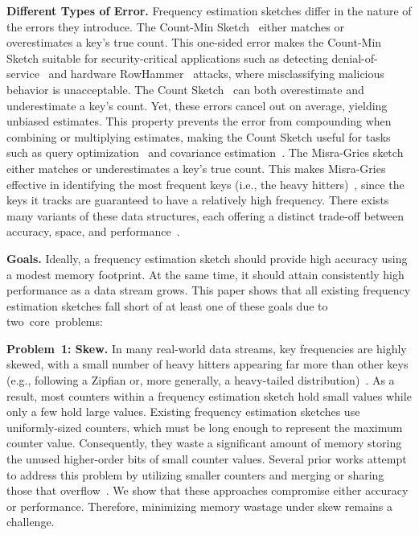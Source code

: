 \documentclass[sigconf]{acmart}
\begin{document}
\textbf{Different Types of Error.}
Frequency estimation sketches differ in the nature of the errors they introduce.
The Count-Min Sketch~\cite{CountMin} either matches or overestimates a key's true count.
This one-sided error makes the Count-Min Sketch suitable for security-critical applications such as detecting denial-of-service~\cite{CoDDoS} and hardware RowHammer~\cite{CoMeT} attacks, where misclassifying malicious behavior is unacceptable.
The Count Sketch~\cite{CountSketch} can both overestimate and underestimate a key's count.
Yet, these errors cancel out on average, yielding unbiased estimates.
This property prevents the error from compounding when combining or multiplying estimates, making the Count Sketch useful for tasks such as query optimization~\cite{Compass,QueryOptimizationSketches,ConvolutionSketch} and covariance estimation~\cite{ASCS}.
The Misra-Gries sketch~\cite{MisraGries} either matches or underestimates a key's true count.
This makes Misra-Gries effective in identifying the most frequent keys (i.e., the heavy hitters)~\cite{NetworkAnomalyDetection1,NetworkAnomalyDetection2}, since the keys it tracks are guaranteed to have a relatively high frequency.
There exists many variants of these data structures, each offering a distinct trade-off between accuracy, space, and \mbox{performance}~\cite{CountMeanMin,SALSA,BitSense,PyramidSketch,StingySketch,AdaptiveCounterSplicing,CounterTree,TreeSensing,TailoredSketch,AugmentedSketch,HeavyGuardian,HeavyKeeper,WavingSketch,ElasticSketch,MVSketch,SpaceSaving,BatchUpdateMisraGries,BitMatcher,JigsawSketch,MicroscopeSketch,PSketch,TightSketch}.

\textbf{Goals.}
Ideally, a frequency estimation sketch should provide high accuracy using a
modest memory footprint. At the same time, it should attain consistently high
performance as a data stream grows. This paper shows that all existing
frequency estimation sketches fall short of at least one of these goals due to
two~core~problems:

\textbf{Problem~1: Skew.}
In many real-world data streams, key frequencies are highly skewed, with a
small number of heavy hitters appearing far more than other keys (e.g.,
following a Zipfian or, more generally, a heavy-tailed
distribution)~\cite{Memento,AdditiveErrorCounters,StingySketch}. As a result,
most counters within a frequency estimation sketch hold small values while only
a few hold large values. Existing frequency estimation sketches use
uniformly-sized counters, which must be long enough to represent the maximum
counter value. Consequently, they waste a significant amount of memory storing
the unused higher-order bits of small counter values. Several prior works
attempt to address this problem by utilizing smaller counters and merging or
sharing those that
overflow~\cite{SALSA,BitSense,PyramidSketch,StingySketch,AdaptiveCounterSplicing,CounterTree,TreeSensing,TailoredSketch}.
We show that these approaches compromise either accuracy or performance.
Therefore, minimizing memory wastage under skew remains a challenge.
\end{document}

